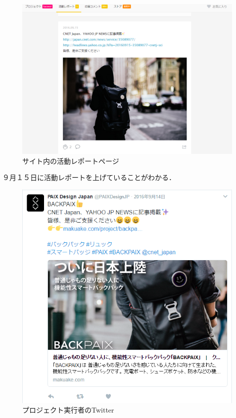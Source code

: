 \begin{figure}[H]
\centering
\includegraphics[width=16cm]{chousa3.PNG}
\caption{サイト内の活動レポートページ}\label{サンプル図}
\end{figure}

９月１５日に活動レポートを上げていることがわかる．

\begin{figure}[H]
\centering
\includegraphics[width=16cm]{chousa4.PNG}
\caption{プロジェクト実行者のTwitter}\label{サンプル図}
\end{figure}

